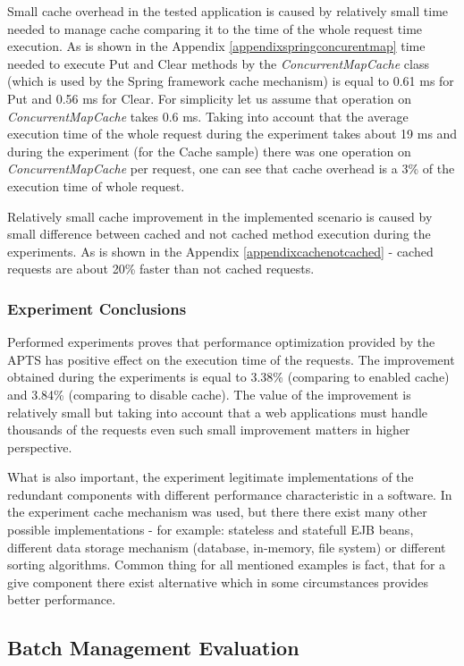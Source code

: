 \documentclass[10pt,a4paper]{article}
\begin{document}
Small cache overhead in the tested application is caused by relatively small time needed to manage cache comparing it to the time of the whole request time execution. As is shown in the Appendix \ref{appendixspringconcurentmap} time needed to execute Put and Clear methods by the \textit{ConcurrentMapCache} class (which is used by the Spring framework cache mechanism) is equal to 0.61 ms for Put and 0.56 ms for Clear. For simplicity let us assume that operation on \textit{ConcurrentMapCache} takes 0.6 ms. Taking into account that the average execution time of the whole request during the experiment takes about 19 ms and during the experiment (for the Cache sample) there was one operation on \textit{ConcurrentMapCache} per request, one can see that cache overhead is a 3\% of the execution time of whole request.  

Relatively small cache improvement in the implemented scenario is caused by small difference between cached and not cached method execution during the experiments. As is shown in the Appendix \ref{appendixcachenotcached} - cached requests are about 20\% faster than not cached requests. 

\subsubsection{Experiment Conclusions} 


Performed experiments proves that performance optimization provided by the APTS has positive effect on the execution time of the requests. The improvement obtained during the experiments is equal to 3.38\% (comparing to enabled cache) and 3.84\% (comparing to disable cache). The value of the improvement is relatively small but taking into account that a web applications must handle thousands of the requests even such small improvement matters in higher perspective.  

What is also important, the experiment legitimate implementations of the redundant components with different performance characteristic in a software. In the experiment cache mechanism was used, but there there exist many other possible implementations - for example: stateless and statefull EJB beans, different data storage mechanism (database, in-memory, file system) or different sorting algorithms. Common thing for all mentioned examples is fact, that for a give component there exist alternative which in some circumstances provides better performance.     

 

\subsection{Batch Management Evaluation}
\end{document}
